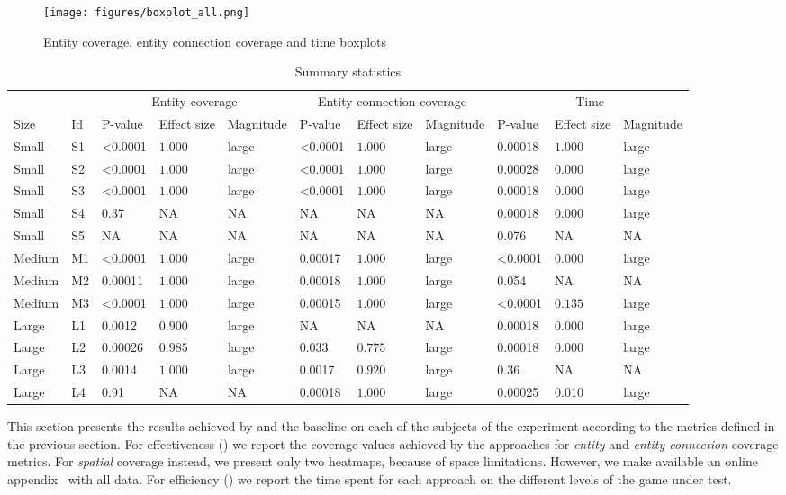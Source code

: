 

\begin{figure*}[!htb]
\texttt{[image: figures/boxplot\_all.png]}
\caption{Entity coverage, entity connection coverage and time boxplots}
 \label{fig:Coverage-and-Time}
\end{figure*}


\begin{table*}[!htb]
{%
\begin{center}
\begin{tabular}{|ll|lll|lll|lll|}
\hline
 &    & \multicolumn{3}{|c|}{Entity coverage} & \multicolumn{3}{|c|}{Entity  connection coverage} & \multicolumn{3}{|c|}{Time} \tabularnewline
 Size & Id & P-value & Effect size & Magnitude & P-value & Effect size & Magnitude & P-value & Effect size & Magnitude \tabularnewline
\hline
\hline
Small&S1&\textless 0.0001&$1.000$&large&\textless 0.0001&$1.000$&large&0.00018&$1.000$&large\tabularnewline
Small&S2&\textless 0.0001&$1.000$&large&\textless 0.0001&$1.000$&large&0.00028&$0.000$&large\tabularnewline
Small&S3&\textless 0.0001&$1.000$&large&\textless 0.0001&$1.000$&large&0.00018&$0.000$&large\tabularnewline
Small&S4&0.37&NA&NA&NA&NA&NA&0.00018&$0.000$&large\tabularnewline
Small&S5&NA&NA&NA&NA&NA&NA&0.076&NA&NA\tabularnewline \hline

Medium&M1&\textless 0.0001&$1.000$&large&0.00017&$1.000$&large&\textless 0.0001&$0.000$&large\tabularnewline
Medium&M2&0.00011&$1.000$&large&0.00018&$1.000$&large&0.054&NA&NA\tabularnewline
Medium&M3&\textless 0.0001&$1.000$&large&0.00015&$1.000$&large&\textless 0.0001&$0.135$&large\tabularnewline \hline

Large&L1&0.0012&$0.900$&large&NA&NA&NA&0.00018&$0.000$&large\tabularnewline
Large&L2&0.00026&$0.985$&large&0.033&$0.775$&large&0.00018&$0.000$&large\tabularnewline
Large&L3&0.0014&$1.000$&large&0.0017&$0.920$&large&0.36&NA&NA\tabularnewline
Large&L4&0.91&NA&NA&0.00018&$1.000$&large&0.00025&$0.010$&large\tabularnewline
\hline
\end{tabular}\end{center}
}
\caption{Summary statistics}
\label{tab:Statistics}
\end{table*}


This section presents the results achieved by \approach and the baseline on each of the subjects of the experiment according to the metrics defined in the previous section. For effectiveness (\rqa) we report the coverage values achieved by the approaches for \emph{entity} and \emph{entity connection} coverage metrics. For \emph{spatial} coverage instead, we present only two heatmaps, because of space limitations. However, we make available an online appendix~\cite{online-appendix} with all data. For efficiency (\rqb) we report the time spent for each approach on the different levels of the game under test.

